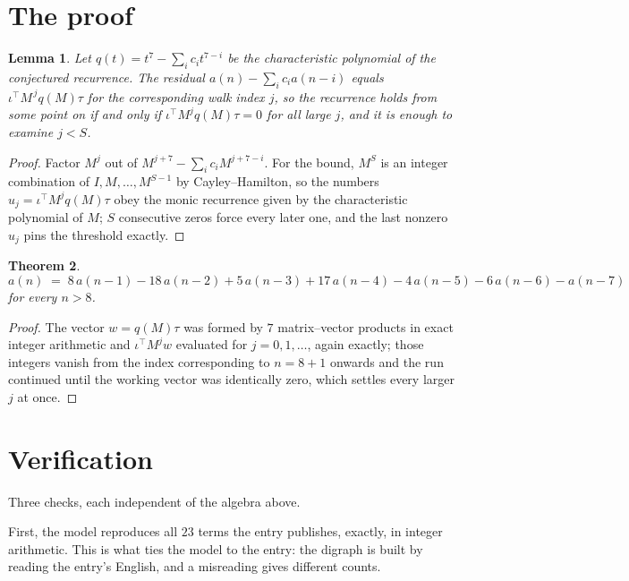 \documentclass[11pt,a4paper]{article}
\theoremstyle{plain}
\newtheorem{theorem}{Theorem}
\newtheorem{lemma}[theorem]{Lemma}
\theoremstyle{definition}
\begin{document}
\section{The proof}

\begin{lemma}\label{lem:crit}
Let $q(t)=t^{7}-\sum_i c_it^{7-i}$ be the characteristic polynomial of the
conjectured recurrence. The residual $a(n)-\sum_ic_ia(n-i)$ equals
$\iota^{\!\top}M^{\,j}q(M)\tau$ for the corresponding walk index $j$, so the recurrence
holds from some point on if and only if $\iota^{\!\top}M^{j}q(M)\tau=0$ for all large $j$,
and it is enough to examine $j<S$.
\end{lemma}

\begin{proof}
Factor $M^{j}$ out of $M^{j+7}-\sum_ic_iM^{j+7-i}$. For the bound, $M^{S}$
is an integer combination of $I,M,\dots,M^{S-1}$ by Cayley--Hamilton, so the numbers
$u_j=\iota^{\!\top}M^{j}q(M)\tau$ obey the monic recurrence given by the characteristic
polynomial of $M$; $S$ consecutive zeros force every later one, and the last nonzero $u_j$
pins the threshold exactly.
\end{proof}

\begin{theorem}
\[
a(n)\;=\;8\,a(n-1) - 18\,a(n-2) + 5\,a(n-3) + 17\,a(n-4) - 4\,a(n-5) - 6\,a(n-6) - a(n-7)
\]
for every $n>8$.
\end{theorem}

\begin{proof}
The vector $w=q(M)\tau$ was formed by $7$ matrix--vector products in exact integer
arithmetic and $\iota^{\!\top}M^{j}w$ evaluated for $j=0,1,\dots$, again exactly; those
integers vanish from the index corresponding to $n=8+1$ onwards and the run continued
until the working vector was identically zero, which settles every larger $j$ at once.
\end{proof}

\section{Verification}

Three checks, each independent of the algebra above.

First, the model reproduces all $23$ terms the entry publishes, exactly, in integer
arithmetic. This is what ties the model to the entry: the digraph is built by reading the
entry's English, and a misreading gives different counts.
\end{document}
